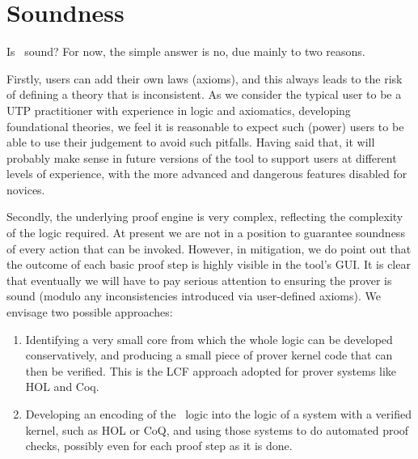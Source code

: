\section{Soundness}\label{sec:soundness}


Is \ sound?
For now, the simple answer is no,
due mainly to two reasons.

Firstly, users can add their own laws (axioms),
and this always leads to the risk of defining a theory that is inconsistent.
As we consider the typical user to be a UTP practitioner with experience in logic
and axiomatics, developing foundational theories,
we feel it is reasonable to expect such (power) users
to be able to use their judgement to avoid such pitfalls.
Having said that, it will probably make sense in future versions
of the tool to support users at different levels of experience,
with the more advanced and dangerous features disabled for novices.

Secondly, the underlying proof engine is very complex,
reflecting the complexity of the logic required.
At present we are not in a position to guarantee soundness of every action
that can be invoked. However, in mitigation, we do point out that
the outcome of each basic proof step is highly visible in the tool's GUI.
It is clear that eventually we will have to pay serious attention
to ensuring the prover is sound (modulo any inconsistencies introduced
via user-defined axioms). We envisage two possible approaches:
\begin{enumerate}
  \item
    Identifying a very small core from which the whole logic can be developed
    conservatively, and producing a small piece of prover kernel code
    that can then be verified. This is the LCF approach adopted for prover systems
    like HOL\cite{books/sp/NipkowPW02} and Coq\cite{tr:Coq:manual:08}.
  \item
    Developing an encoding of the \ logic into the logic of a system
    with a verified kernel, such as HOL or CoQ, and using those systems
    to do automated proof checks, possibly even for each proof step as it is
    done.
\end{enumerate}
